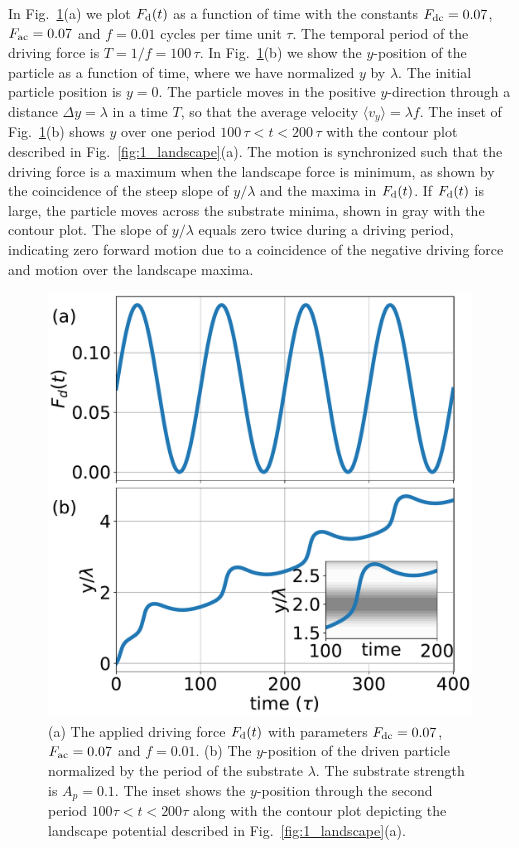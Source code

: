 \documentclass[preprint,showpacs,preprintnumbers,amsmath,amssymb,aps,prb]{revtex4-1}
\theoremstyle{remark}
\begin{document}
In Fig.~\ref{fig:2_Fd_vy_time}(a)
we plot $F_{\rm d}(t)$ 
as a function of time with the
constants $F_{\rm dc}=0.07$, 
$F_{\rm ac}=0.07$ and $f=0.01$ cycles per time unit $\tau$.
The temporal period of the driving force is
$T = 1/f = 100\,\tau$.
In Fig.~\ref{fig:2_Fd_vy_time}(b) 
we show the $y$-position of the particle
as a function of time,
where we have
normalized $y$ by $\lambda$.
The initial particle position is $y = 0$. 
The particle moves
in the positive $y$-direction
through a distance $\Delta y = \lambda$  in a time $T$,
so that  
the average velocity 
$\langle {v}_y \rangle = \lambda f$. 
The inset of Fig.~\ref{fig:2_Fd_vy_time}(b)
shows $y$ 
over one period $100\,\tau < t < 200\,\tau$
with 
the contour plot described
in Fig.~\ref{fig:1_landscape}(a).
The motion is synchronized such that the 
driving force is a maximum when the landscape 
force is minimum,
as shown by the coincidence of the
steep slope of 
$y/\lambda$ 
and the maxima in $F_{\rm d}(t)$.
If $F_{\rm d}(t)$ is large,
the particle moves across the substrate minima,
shown in gray with the contour plot.
The slope of $y/\lambda$ equals zero twice
during a driving period,
indicating zero
forward motion 
due to a coincidence of the negative
driving force and motion over the landscape maxima.
\begin{figure}[h]
\centering
\includegraphics[width=\columnwidth]{fig2_Fd_vy_time.pdf}
\caption{(a) The applied driving force $F_{\rm d}(t)$ 
  with parameters $F_{\rm dc} = 0.07$, $F_{\rm ac} = 0.07$ and $f=0.01$.
  (b) 
  The $y$-position of the driven particle
  normalized by the period of the substrate $\lambda$.
  The substrate strength is $A_p=0.1$.
  The inset   shows
  the $y$-position
  through the second period $100\tau<t<200\tau$
 along with the contour plot depicting
  the landscape potential described in Fig.~\ref{fig:1_landscape}(a).
  }
\label{fig:2_Fd_vy_time}
\end{figure}
\end{document}
